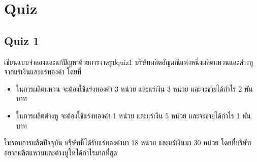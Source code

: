 \chapter{Quiz}
\newpage
\section*{Quiz 1}
\begin{exercise}{เขียนแบบจำลองและแก้ปัญหาด้วยการวาดรูป}{quiz1}
    บริษัทผลิตอัญมณีแห่งหนึ่งผลิตแหวนและต่างหูจากแร่เงินและแร่ทองคำ โดยที่
    \begin{itemize}
        \item ในการผลิตแหวน จะต้องใช้แร่งทองคำ 3 หน่วย และแร่เงิน 3 หน่วย และจะขายได้กำไร 2 พันบาท
        \item ในการผลิตต่างหู จะต้องใช้แร่งทองคำ 1 หน่วย และแร่เงิน 5 หน่วย และจะขายได้กำไร 1 พันบาท
    \end{itemize}
    ในรอบการผลิตปัจจุบัน บริษัทนี้ได้รับแร่ทองคำมา 18 หน่วย และแร่เงินมา 30 หน่วย โดยที่บริษัทอยากผลิตแหวนและต่างหูให้ได้กำไรมากที่สุด
\end{exercise}

